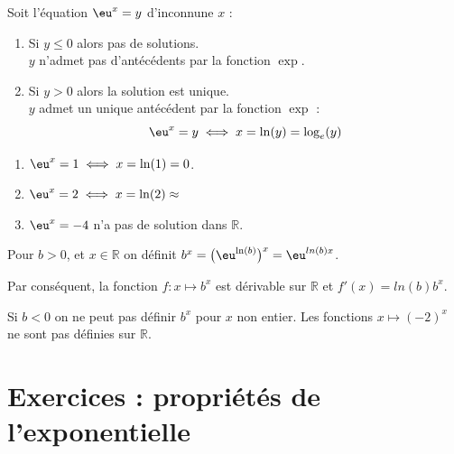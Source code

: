 \documentclass[main.tex]{subfiles}
\begin{document}
\begin{property} Soit l'équation $\eu^x=y$ d'inconnune $x$ :
	\begin{enumerate}[label=(\roman*), leftmargin=*]
		\item Si $y\leqslant 0$ alors pas de solutions.\\
		 $y$ n'admet pas d'antécédents par la fonction $\exp$.
		 \item Si $y>0$ alors la solution est unique.\\
		 $y$ admet un unique antécédent par la fonction $\exp$ :
		 \setlength{\abovedisplayskip}{3pt}
		 \setlength{\belowdisplayskip}{3pt}
		 $$\eu^{x}=y \iff x=\ln(y)=\log_{e}(y)$$
	\end{enumerate} 
\end{property}
\begin{example} \hfill 
	\begin{enumerate}[leftmargin=*, label=\arabic*)]
		\item $\eu^x=1 \iff  x=\ln(1)=0$.
		\item $\eu^x=2 \iff  x=\ln(2)\approx $ 
		\item $\eu^x=-4$ n'a pas de solution dans $\mathbb{R}$.
	\end{enumerate} 
\end{example}

\begin{remark} Pour $b>0$, et  $x\in\mathbb{R}$ on définit $b^x= \big(\eu^{\ln(b)}\big)^x=\eu^{ln(b) x}$.
	
Par conséquent, la fonction $f\colon x \mapsto b^x$ est dérivable sur $\mathbb{R}$ et  $f'(x) = ln(b) b^x$.
\end{remark}
\begin{remark} Si $b<0$ on ne peut pas définir $b^x$ pour $x$ non entier. Les fonctions $x\mapsto (-2)^x$ ne sont pas définies sur $\mathbb{R}$. 
\end{remark}
%
\newpage 
{}  
\pagestyle{scrheadings} %
\onehalfspacing 
\vspace{-2mm}
\section{Exercices : propriétés  de l'exponentielle}
\end{document}
